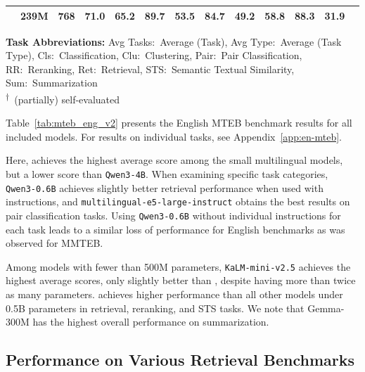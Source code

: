 \documentclass[11pt]{article}
\begin{document}
\begin{table}[t]
\begin{tabular}{@{}lcccccccccccc@{}}
\JEmbeddingVFiveTextNanoShort{} & 239M  & 768 & 71.0 & 65.2 & 89.7 & 53.5 & 84.7 & \textbf{49.2} & \textbf{58.8} & \textbf{88.3} & 31.9 \\
\bottomrule
\end{tabular}
\medskip
\begin{flushleft}
\textbf{Task Abbreviations:}
Avg Tasks:~Average (Task),
Avg Type:~Average (Task Type),
Cls:~Classification,
Clu:~Clustering,
Pair:~Pair Classification,
RR:~Reranking,
Ret:~Retrieval,
STS:~Semantic Textual Similarity,
Sum:~Summarization \\
\textsuperscript{†}~(partially) self-evaluated
\end{flushleft}
\end{table}

Table~\ref{tab:mteb_eng_v2} presents the English MTEB benchmark results for all included models.
For results on individual tasks, see Appendix~\ref{app:en-mteb}.

Here, \JEmbeddingVFiveTextSmall{} achieves the highest average score among the small multilingual models, but a lower score than \texttt{Qwen3-4B}.
When examining specific task categories, \texttt{Qwen3-0.6B} achieves slightly better retrieval performance when used with instructions, and \texttt{multilingual-e5-large-instruct} obtains the best results on pair classification tasks.
Using \texttt{Qwen3-0.6B} without individual instructions for each task leads to a similar loss of performance for English benchmarks as was observed for MMTEB.

Among models with fewer than 500M parameters, \texttt{KaLM-mini-v2.5} achieves the highest average scores, only slightly better than \JEmbeddingVFiveTextNano{}, despite having more than twice as many parameters.
\JEmbeddingVFiveTextNano{} achieves higher performance than all other models under 0.5B parameters in retrieval, reranking, and STS tasks. We note that Gemma-300M has the highest overall performance on summarization. %


\subsection{Performance on Various Retrieval Benchmarks}
\label{eval:retrieval}
\end{document}
